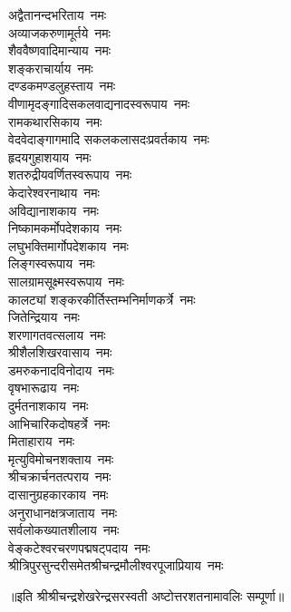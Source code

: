 \begin{flushleft}
अद्वैतानन्दभरिताय~नमः\\
अव्याजकरुणामूर्तये~नमः\\
शैववैष्णवादिमान्याय~नमः\\
शङ्कराचार्याय~नमः\hfill{}\\
दण्डकमण्डलुहस्ताय~नमः\\
वीणामृदङ्गादिसकलवाद्यनादस्वरूपाय~नमः\\
रामकथारसिकाय~नमः\\
वेदवेदाङ्गागमादि सकलकलासदःप्रवर्तकाय~नमः\\
हृदयगुहाशयाय~नमः\\
शतरुद्रीयवर्णितस्वरूपाय~नमः\\
केदारेश्वरनाथाय~नमः\\
अविद्यानाशकाय~नमः\\
निष्कामकर्मोपदेशकाय~नमः\\
लघुभक्तिमार्गोपदेशकाय~नमः\hfill{}\\
लिङ्गस्वरूपाय~नमः\\
सालग्रामसूक्ष्मस्वरूपाय~नमः\\
कालट्यां शङ्करकीर्तिस्तम्भनिर्माणकर्त्रे~नमः\\
जितेन्द्रियाय~नमः\\
शरणागतवत्सलाय~नमः\\
श्रीशैलशिखरवासाय~नमः\\
डमरुकनादविनोदाय~नमः\\
वृषभारूढाय~नमः\\
दुर्मतनाशकाय~नमः\\
आभिचारिकदोषहर्त्रे~नमः\hfill{}\\
मिताहाराय~नमः\\
मृत्युविमोचनशक्ताय~नमः\\
श्रीचक्रार्चनतत्पराय~नमः\\
दासानुग्रहकारकाय~नमः\\
अनुराधानक्षत्रजाताय~नमः\\
सर्वलोकख्यातशीलाय~नमः\\
वेङ्कटेश्वरचरणपद्मषट्पदाय~नमः\\
श्रीत्रिपुरसुन्दरीसमेतश्रीचन्द्रमौलीश्वरपूजाप्रियाय~नमः\\
\end{flushleft}
॥इति श्रीश्रीचन्द्रशेखरेन्द्रसरस्वती अष्टोत्तरशतनामावलिः सम्पूर्णा॥
